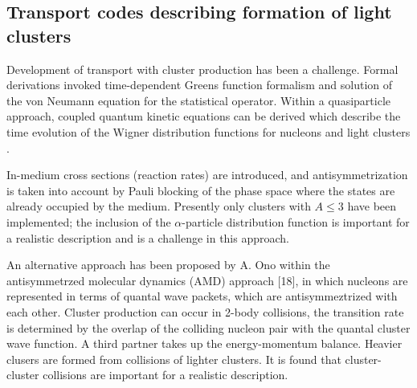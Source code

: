 \documentclass[epj]{svjour}
\begin{document}
\subsection{Transport codes describing formation of light clusters}

Development of transport with cluster production has been a challenge.
Formal derivations invoked time-dependent Greens function formalism and solution of the von Neumann
equation for the statistical operator. 
Within a quasiparticle approach, coupled quantum kinetic equations can be derived which describe the 
time evolution of the Wigner  distribution functions for nucleons and light clusters \cite{Pawel,Kuhrts}.

In-medium cross sections (reaction rates) are introduced, and antisymmetrization is taken into account by Pauli blocking of the phase space where the states are already occupied by the medium. 
Presently only clusters with $A\le 3$ have been implemented;
the inclusion of the $\alpha$-particle distribution function is important for a realistic description and is a challenge in this approach.

An alternative approach has been proposed by A. Ono within the antisymmetrzed molecular dynamics (AMD) approach [18], in which nucleons are represented in terms of quantal wave packets, which are antisymmeztrized with each other. Cluster production can occur in 2-body collisions, the transition rate is determined by the overlap of the colliding nucleon pair with the quantal cluster wave function. A third partner takes up the energy-momentum balance. Heavier clusers are formed from collisions of lighter clusters. It is found that cluster-cluster collisions are important for a realistic description.  

\end{document}
